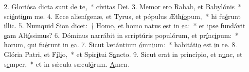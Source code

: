 2. Gloriósa d\uline{i}cta sunt d\uline{e} te,~* c\uline{í}vitas D\uline{e}i.
3. Memor ero Rahab, et B\uline{a}byl\uline{ó}nis~* sci\uline{é}nti\uline{u}m me.
4. Ecce alienígenæ, et Tyrus, et pópulus Æth\uline{í}\uline{o}pum,~* hi fu\uline{é}runt \uline{i}llic.
5. Numquid Sion dicet:~† Homo, et homo natus \uline{e}st in \uline{e}a:~* et ipse fundávit \uline{e}am Alt\uline{í}ssimus?
6. Dóminus narrábit in scriptúris populórum, et pr\uline{í}nc\uline{i}pum:~* horum, qui fu\uline{é}runt in \uline{e}a.
7. Sicut lætántium \uline{ó}mn\uline{i}um:~* habitáti\uline{o} est \uline{i}n te.
8. Glória Patri, et F\uline{í}l\uline{i}o,~* et Spir\uline{í}tui S\uline{a}ncto.
9. Sicut erat in princípio, et n\uline{u}nc, et s\uline{e}mper,~* et in sǽcula sæcul\uline{ó}rum. \uline{A}men.
